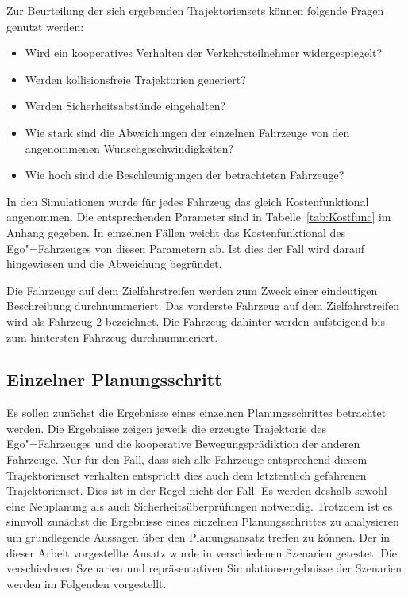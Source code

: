 Zur Beurteilung der sich ergebenden Trajektoriensets k\"onnen folgende Fragen genutzt werden:
\begin{itemize}
\item Wird ein kooperatives Verhalten der Verkehrsteilnehmer widergespiegelt?
\item Werden kollisionsfreie Trajektorien generiert?
\item Werden Sicherheitsabst\"ande eingehalten?
\item Wie stark sind die Abweichungen der einzelnen Fahrzeuge von den angenommenen Wunschgeschwindigkeiten?
\item Wie hoch sind die Beschleunigungen der betrachteten Fahrzeuge?
\end{itemize}


In den Simulationen wurde f\"ur jedes Fahrzeug das gleich Kostenfunktional angenommen.
Die entsprechenden Parameter sind in Tabelle~\ref{tab:Kostfunc} im Anhang gegeben. 
In einzelnen F\"allen weicht das Kostenfunktional des Ego"=Fahrzeuges von diesen Parametern ab.
Ist dies der Fall wird darauf hingewiesen und die Abweichung begr\"undet.

Die Fahrzeuge auf dem Zielfahrstreifen werden zum Zweck einer eindeutigen Beschreibung durchnummeriert.
Das vorderste Fahrzeug auf dem Zielfahrstreifen wird als Fahrzeug 2 bezeichnet.
Die Fahrzeug dahinter werden aufsteigend bis zum hintersten Fahrzeug durchnummeriert.

\subsection{Einzelner Planungsschritt}
\label{sec:einzelPlanungsschritt}
Es sollen zun\"achst die Ergebnisse eines einzelnen Planungsschrittes betrachtet werden.
Die Ergebnisse zeigen jeweils die erzeugte Trajektorie des Ego"=Fahrzeuges und die kooperative Bewegungspr\"adiktion der anderen Fahrzeuge.
Nur f\"ur den Fall, dass sich alle Fahrzeuge entsprechend diesem Trajektorienset verhalten entspricht dies auch dem letztentlich gefahrenen Trajektorienset.
Dies ist in der Regel nicht der Fall.
Es werden deshalb sowohl eine Neuplanung als auch Sicherheits\"uberpr\"ufungen notwendig.
Trotzdem ist es sinnvoll zun\"achst die Ergebnisse eines einzelnen Planungsschrittes zu analysieren um grundlegende Aussagen \"uber den Planungsansatz treffen zu k\"onnen.
Der in dieser Arbeit vorgestellte Ansatz wurde in verschiedenen Szenarien getestet.
Die verschiedenen Szenarien und repr\"asentativen Simulationsergebnisse der Szenarien werden im Folgenden vorgestellt.


